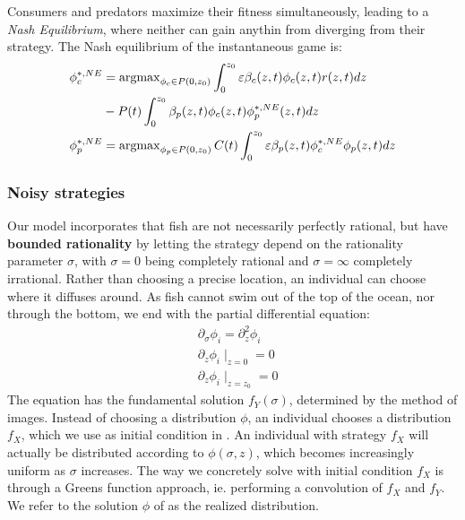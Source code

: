 Consumers and predators maximize their fitness simultaneously, leading to a \emph{Nash Equilibrium}, where neither can gain anythin from diverging from their strategy. The Nash equilibrium of the instantaneous game is:
\begin{align}
  \label{eq:nash_equilibria}
	\phi_c^{*,NE} &=  \argmax_{\phi_c \in P(0,z_0)}  \int_0^{z_0} \varepsilon \beta_c(z,t)\phi_c(z,t)r(z,t) dz \\ &- P(t)\int_0^{z_0} \beta_p(z,t) \phi_c(z,t) \phi_p^{*,NE}(z,t) dz \\
	\phi_p^{*,NE} &=  \argmax_{\phi_p \in P(0,z_0)}C(t) \int_0^{z_0} \varepsilon \beta_p(z,t)\phi_c^{*,NE} \phi_p(z,t) dz
\end{align}

\subsubsection*{Noisy strategies} %
Our model incorporates that fish are not necessarily perfectly rational, but have \textbf{bounded rationality} by letting the strategy depend on the rationality parameter $\sigma$, with $\sigma=0$ being completely rational and $\sigma = \infty$ completely irrational. Rather than choosing a precise location, an individual can choose where it diffuses around. As fish cannot swim out of the top of the ocean, nor through the bottom, we end with the partial differential equation:
\begin{align}
  \label{eq:density_PDE}
	&\partial_\sigma \phi_i = \partial_z^2 \phi_i \\
	&\partial_z \phi_i \mid_{z=0} = 0 \\
  &\partial_z \phi_i \mid_{z = z_0} = 0
\end{align}
The equation  has the fundamental solution $f_Y(\sigma)$, determined by the method of images. Instead of choosing a distribution $\phi$, an individual chooses a distribution $f_X$, which we use as initial condition in . An individual with strategy $f_X$ will actually be distributed according to $\phi(\sigma,z)$, which becomes increasingly uniform as $\sigma$ increases. The way we concretely solve  with initial condition $f_X$ is through a Greens function approach, ie. performing a convolution of $f_X$ and $f_Y$. We refer to the solution $\phi$ of  as the realized distribution.

